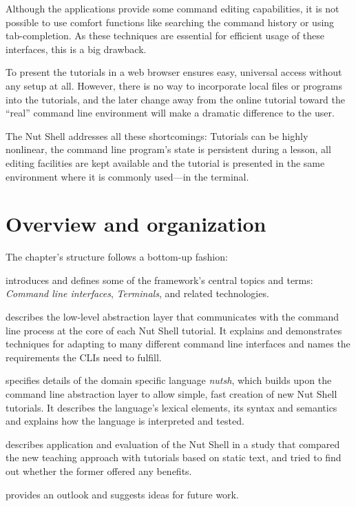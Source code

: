 \documentclass[paper=a4,twoside,abstract=on,cleardoublepage=empty,numbers=noenddot,toc=bib,12pt,appendixprefix=true]{scrreprt}
\begin{document}
Although the applications provide some command editing capabilities, it is not possible to use comfort functions like searching the command history or using tab-completion. As these techniques are essential for efficient usage of these interfaces, this is a big drawback.

To present the tutorials in a web browser ensures easy, universal access without any setup at all. However, there is no way to incorporate local files or programs into the tutorials, and the later change away from the online tutorial toward the “real” command line environment will make a dramatic difference to the user.

The Nut Shell addresses all these shortcomings: Tutorials can be highly nonlinear, the command line program's state is persistent during a lesson, all editing facilities are kept available and the tutorial is presented in the same environment where it is commonly used---in the terminal.

\section{Overview and organization}

The chapter's structure follows a bottom-up fashion:

 introduces and defines some of the framework's central topics and terms: \emph{Command line interfaces}, \emph{Terminals}, and related technologies.

 describes the low-level abstraction layer that communicates with the command line process at the core of each Nut Shell tutorial. It explains and demonstrates techniques for adapting to many different command line interfaces and names the requirements the CLIs need to fulfill.

 specifies details of the domain specific language \emph{nutsh}, which builds upon the command line abstraction layer to allow simple, fast creation of new Nut Shell tutorials. It describes the language's lexical elements, its syntax and semantics and explains how the language is interpreted and tested.

 describes application and evaluation of the Nut Shell in a study that compared the new teaching approach with tutorials based on static text, and tried to find out whether the former offered any benefits.

 provides an outlook and suggests ideas for future work.
\end{document}
